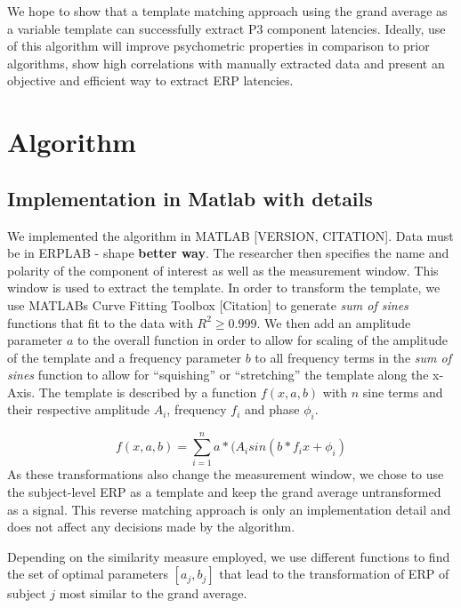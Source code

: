 \documentclass[
  man,floatsintext]{apa7}
\begin{document}
We hope to show that a template matching approach using the grand average as a variable template can successfully extract P3 component latencies. Ideally, use of this algorithm will improve psychometric properties in comparison to prior algorithms, show high correlations with manually extracted data and present an objective and efficient way to extract ERP latencies.

\hypertarget{algorithm}{%
\section{Algorithm}\label{algorithm}}

\hypertarget{implementation-in-matlab-with-details}{%
\subsection{Implementation in Matlab with details}\label{implementation-in-matlab-with-details}}

We implemented the algorithm in MATLAB {[}VERSION, CITATION{]}. Data must be in ERPLAB - shape \textbf{better way}. The researcher then specifies the name and polarity of the component of interest as well as the measurement window. This window is used to extract the template. In order to transform the template, we use MATLABs Curve Fitting Toolbox {[}Citation{]} to generate \emph{sum of sines} functions that fit to the data with \(R^2 \ge 0.999\). We then add an amplitude parameter \(a\) to the overall function in order to allow for scaling of the amplitude of the template and a frequency parameter \(b\) to all frequency terms in the \emph{sum of sines} function to allow for ``squishing'' or ``stretching'' the template along the x-Axis. The template is described by a function \(f(x, a, b)\) with \(n\) sine terms and their respective amplitude \(A_i\), frequency \(f_i\) and phase \(\phi_i\).

\[f(x, a,b ) = \sum_{i = 1}^{n} a*(A_isin(b*f_ix + \phi_i)\]
As these transformations also change the measurement window, we chose to use the subject-level ERP as a template and keep the grand average untransformed as a signal. This reverse matching approach is only an implementation detail and does not affect any decisions made by the algorithm.

Depending on the similarity measure employed, we use different functions to find the set of optimal parameters \([a_j, b_j]\) that lead to the transformation of ERP of subject \(j\) most similar to the grand average.
\end{document}

